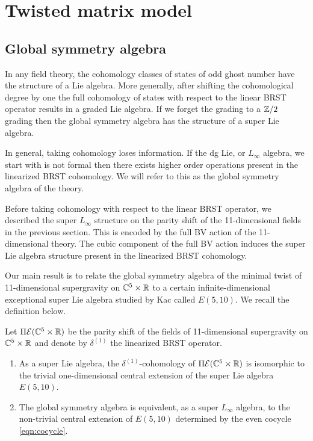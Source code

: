 \section{Twisted matrix model}

\subsection{Global symmetry algebra}
\label{sec:global}

In any field theory, the cohomology classes of states of odd ghost number have the structure of a Lie algebra. 
More generally, after shifting the cohomological degree by one the full cohomology of states with respect to the linear BRST operator results in a graded Lie algebra. 
If we forget the grading to a $\mathbb Z/2$ grading then the global symmetry algebra has the structure of a super Lie algebra. 

In general, taking cohomology loses information. 
If the dg Lie, or $L_\infty$ algebra, we start with is not formal then there exists higher order operations present in the linearized BRST cohomology. 
We will refer to this as the global symmetry algebra of the theory.

Before taking cohomology with respect to the linear BRST operator, we described the super $L_\infty$ structure on the parity shift of the 11-dimensional fields in the previous section. 
This is encoded by the full BV action of the 11-dimensional theory.
The cubic component of the full BV action induces the super Lie algebra structure present in the linearized BRST cohomology. 

Our main result is to relate the global symmetry algebra of the minimal twist of 11-dimensional supergravity on $\mathbb C^5 \times \mathbb R$ to a certain infinite-dimensional exceptional super Lie algebra studied by Kac \cite{KacClass,KR} called $E(5,10)$.
We recall the definition below. 

\begin{thm}\label{thm:global}
Let $\Pi\mathcal E(\mathbb C^5 \times \mathbb R)$ be the parity shift of the fields of 11-dimensional supergravity on $\mathbb C^5 \times \mathbb R$ and denote by $\delta^{(1)}$ the linearized BRST operator. 
\begin{enumerate}
\item 
As a super Lie algebra, the $\delta^{(1)}$-cohomology of $\Pi\mathcal E(\mathbb C^5 \times \mathbb R)$ is isomorphic to the trivial one-dimensional central extension of the super Lie algebra $E(5,10)$.
\item 
The global symmetry algebra is equivalent, as a super $L_\infty$ algebra, to the non-trivial central extension of $E(5,10)$ determined by the even cocycle \eqref{eqn:cocycle}. 
\end{enumerate}
\end{thm}

